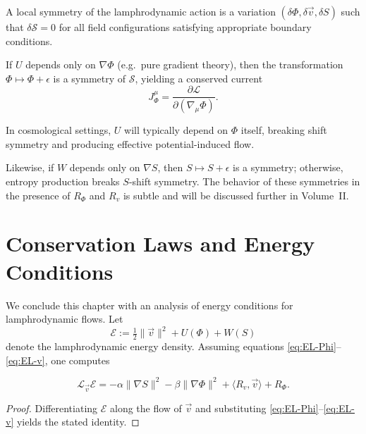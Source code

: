 \begin{definition}
A local symmetry of the lamphrodynamic action is a variation
$(\delta\Phi,\delta\vec v,\delta S)$ such that
$\delta\mathcal{S}=0$ for all field configurations satisfying
appropriate boundary conditions.
\end{definition}

\begin{proposition}
If $U$ depends only on $\nabla\Phi$ (e.g.\ pure gradient theory),
then the transformation $\Phi\mapsto \Phi+\epsilon$ is a symmetry
of $\mathcal{S}$, yielding a conserved current
\[
J^{\mu}_{\Phi} = \frac{\partial\mathcal{L}}{\partial(\nabla_{\mu}\Phi)}.
\]
\end{proposition}

\begin{remark}
In cosmological settings, $U$ will typically depend on $\Phi$ itself,
breaking shift symmetry and producing effective potential-induced flow.
\end{remark}

Likewise, if $W$ depends only on $\nabla S$, then $S\mapsto S+\epsilon$
is a symmetry; otherwise, entropy production breaks $S$-shift symmetry.
The behavior of these symmetries in the presence of $R_{\Phi}$ and
$R_v$ is subtle and will be discussed further in Volume~II.


\section{Conservation Laws and Energy Conditions}

We conclude this chapter with an analysis of energy conditions for
lamphrodynamic flows.
Let
\[
\mathcal{E} := \tfrac12\|\vec v\|^2 + U(\Phi) + W(S)
\]
denote the lamphrodynamic energy density.
Assuming equations \eqref{eq:EL-Phi}--\eqref{eq:EL-v}, one computes

\begin{proposition}
\begin{equation}
\mathcal{L}_{\vec v}\mathcal{E}
= - \alpha\|\nabla S\|^2 - \beta\|\nabla\Phi\|^2
+ \langle R_{v},\vec v\rangle + R_{\Phi}.
\end{equation}
\end{proposition}

\begin{proof}[Proof]
Differentiating $\mathcal{E}$ along the flow of $\vec v$ and substituting
\eqref{eq:EL-Phi}--\eqref{eq:EL-v} yields the stated identity.
\end{proof}

